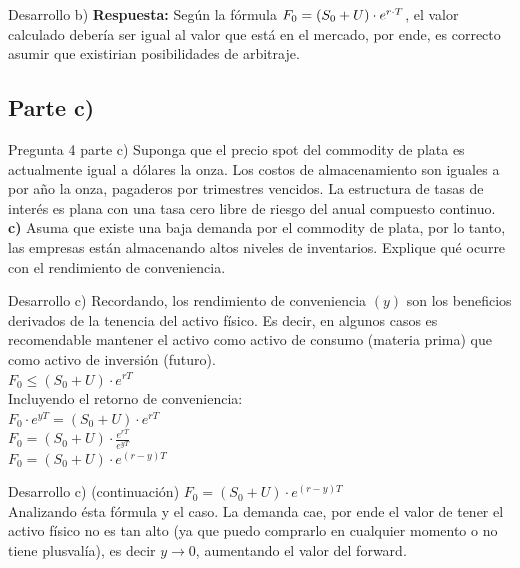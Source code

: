 \documentclass{beamer}
\newif\ifpresentacion
\newcommand{\pausa}{\ifpresentacion\pause\fi}
\begin{document}
\begin{frame}{Desarrollo b)}
\justify
\Large
\textbf{Respuesta:}  
Según la fórmula \(F_0 = \left(S_0+U \right) \cdot{e^{r \cdot T}}\), el valor calculado debería ser igual al valor que está en el mercado,
por ende, es correcto asumir que existirian posibilidades de arbitraje.
\end{frame}

\subsection{Parte c)}

\begin{frame}{Pregunta 4 parte c)}
  \justify
  \large
  Suponga que el precio spot del commodity de plata es actualmente igual a \dinero{\plata} dólares  
  la onza. Los costos de almacenamiento son iguales a \dinero{\almacenamiento} por año la onza, pagaderos por
  trimestres vencidos. La estructura de tasas de interés es plana con una tasa cero libre 
  de riesgo del \porcentaje{\tlr} anual compuesto continuo.\\
  \vspace{.5em}
  \textbf{c)}	Asuma que existe una baja demanda por el commodity de plata, por lo tanto, 
  las empresas están almacenando altos niveles de inventarios. 
  Explique qué ocurre con el rendimiento de conveniencia. 
\end{frame}

\begin{frame}{Desarrollo c)}
  \justify
  \large
  Recordando, los rendimiento de conveniencia $(y)$ son los beneficios derivados de la tenencia del activo físico.
  Es decir, en algunos casos es recomendable mantener el activo como activo de consumo (materia prima) que como activo
  de inversión (futuro).\\
  \(F_0 \leq \left(S_0+U\right) \cdot e^{rT} \)\\
  \pausa
  Incluyendo el retorno de conveniencia:\\
  \(F_0 \cdot e^{yT}= \left(S_0+U\right) \cdot e^{rT} \)\\
  \pausa
  \(F_0 = \left(S_0+U\right) \cdot \frac{e^{rT}}{e^{yT}}  \)\\
  \pausa
  \(F_0 = \left(S_0+U\right) \cdot e^{\left(r-y\right)T} \)\\
\end{frame}
  
\begin{frame}{Desarrollo c) (continuación)}
  \justify
  \Large
  \(F_0 = \left(S_0+U\right) \cdot e^{\left(r-y\right)T} \)\\
 \vspace{1em} 
  Analizando ésta fórmula y el caso. La demanda cae, por ende el valor de tener el activo físico no es 
  tan alto (ya que puedo comprarlo en cualquier momento o no tiene plusvalía), es decir $y \rightarrow 0$, 
  aumentando el valor del forward.


\end{frame}
  
\end{document}
